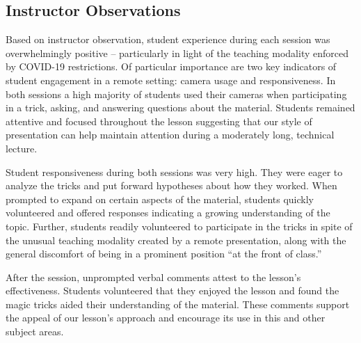 \subsection{Instructor Observations}

Based on instructor observation, student experience during
each session was overwhelmingly positive --
particularly in light of the teaching modality enforced by COVID-19
restrictions.
Of particular importance are two key indicators
of student engagement in a remote setting: camera usage and
responsiveness.  In both sessions a high majority of students used their
cameras when participating in a trick, asking, and answering questions
about the material.  Students remained attentive and focused throughout
 the lesson suggesting that our
style of presentation can help maintain attention during a moderately long,
technical lecture.

Student responsiveness during both sessions was very high.
They were eager to analyze the
tricks and put forward hypotheses about how they worked.
When prompted to
expand on certain aspects of the material, students quickly volunteered and
offered responses indicating a growing understanding of the topic.
Further, students readily volunteered to participate in the tricks in spite
of the unusual teaching modality created by a remote presentation,
along with the general discomfort of being in a
prominent position ``at the front of class.''

After the session,
unprompted verbal comments attest to the lesson's effectiveness.
Students volunteered that they enjoyed the
lesson and found the magic tricks aided their understanding of the
material.  These comments support the appeal of our lesson's approach and
encourage its use in this and other subject areas.
